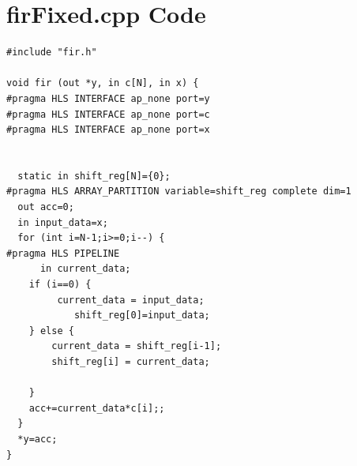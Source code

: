 \documentclass{article}
\begin{document}
\section{firFixed.cpp Code}
\begin{lstlisting}
#include "fir.h"

void fir (out *y, in c[N], in x) {
#pragma HLS INTERFACE ap_none port=y
#pragma HLS INTERFACE ap_none port=c
#pragma HLS INTERFACE ap_none port=x


  static in shift_reg[N]={0};
#pragma HLS ARRAY_PARTITION variable=shift_reg complete dim=1
  out acc=0;
  in input_data=x;
  for (int i=N-1;i>=0;i--) {
#pragma HLS PIPELINE
	  in current_data;
	if (i==0) {
		 current_data = input_data;
			shift_reg[0]=input_data;
    } else {
        current_data = shift_reg[i-1];
        shift_reg[i] = current_data;

    }
    acc+=current_data*c[i];;
  }
  *y=acc;
}

\end{lstlisting}
\vspace{5cm}
\end{document}
